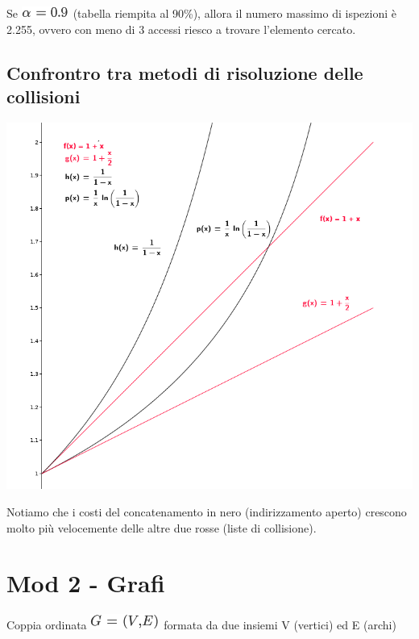 \documentclass{article}
\begin{document}
{Se }\includegraphics{images/image331.png}{~(tabella riempita al 90\%),
allora il numero massimo di ispezioni è 2.255, ovvero con meno di 3
accessi riesco a trovare l'elemento cercato.}

{}

\hypertarget{h.sg1b57l388xe}{\subsection{\texorpdfstring{{Confrontro tra
metodi di risoluzione delle
collisioni}}{Confrontro tra metodi di risoluzione delle collisioni}}\label{h.sg1b57l388xe}}

{\includegraphics{images/image541.png}}

{}

{Notiamo che i costi del concatenamento in nero (indirizzamento aperto)
crescono molto più velocemente delle altre due rosse (liste di
collisione).}

\hypertarget{h.fi9e3nt34nfb}{\section{\texorpdfstring{{Mod 2 -
}{Grafi}}{Mod 2 - Grafi}}\label{h.fi9e3nt34nfb}}

{Coppia ordinata }\includegraphics{images/image335.png}{~formata da due
insiemi V (vertici) ed E (archi)}
\end{document}
